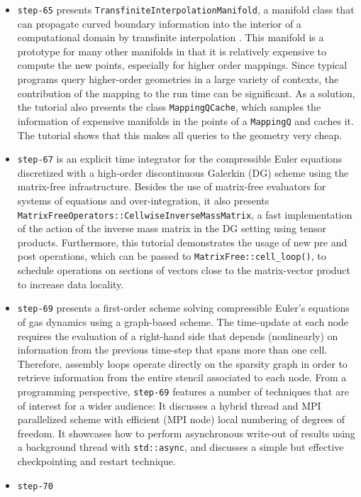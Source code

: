 \documentclass{ansarticle-preprint}
\begin{document}
\begin{itemize}
\item \texttt{step-65} presents \texttt{TransfiniteInterpolationManifold}, a
manifold class that can propagate curved boundary information into the
interior of a computational domain by transfinite interpolation \cite{Gordon82}.
This manifold is a prototype for many other manifolds in that it is relatively
expensive to compute the new points, especially for higher order mappings. Since
typical programs query higher-order geometries in a large variety of contexts,
the contribution of the mapping to the run time can be significant. As a
solution, the tutorial also presents the class \texttt{MappingQCache}, which
samples the information of expensive manifolds in the points of a
\texttt{MappingQ} and caches it. The tutorial shows that this makes all queries
to the geometry very cheap.

\item \texttt{step-67} is an explicit time integrator for the
compressible Euler equations discretized with a high-order discontinuous
Galerkin (DG) scheme using the matrix-free infrastructure. Besides the use of
matrix-free evaluators for systems of equations and over-integration, it also
presents \texttt{MatrixFreeOperators::CellwiseInverseMassMatrix}, a fast implementation
of the action of the inverse mass matrix in the DG setting using tensor
products. Furthermore, this tutorial demonstrates the usage of new
pre and post operations, which can be passed to
\texttt{MatrixFree::cell\_loop()}, to schedule operations on sections of vectors close
to the matrix-vector product to increase data locality.

\item \texttt{step-69} presents a first-order scheme solving compressible
Euler's equations of gas dynamics using a graph-based scheme. The time-update
at each node requires the evaluation of a right-hand side that depends
(nonlinearly) on information from the previous time-step that spans more than
one cell. Therefore, assembly loops operate directly on the sparsity graph in
order to retrieve information from the entire stencil associated to each
node. From a programming perspective, \texttt{step-69} features a number of
techniques that are of interest for a wider audience: It discusses a hybrid
thread and MPI parallelized scheme with efficient (MPI node) local
numbering of degrees of freedom. It showcases how to perform asynchronous
write-out of results using a background thread with \texttt{std::async},
and discusses a simple but effective checkpointing and restart technique.

\item \texttt{step-70}
\end{itemize}
\end{document}
